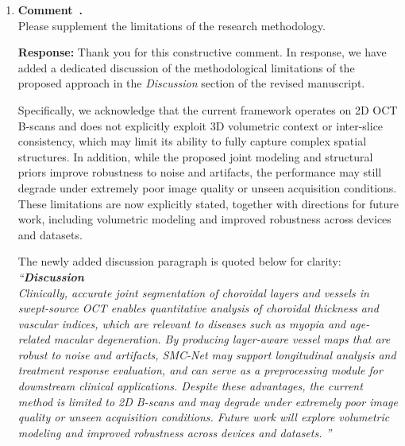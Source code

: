 \documentclass[11pt]{article}
\newcommand{\commentresponse}[2]{{\color{blue}\textbf{Response:} #2}}
\newcommand{\commentitem}{\item \textbf{Comment~\arabic{enumi}.}\\\ignorespaces}
\begin{document}
\begin{enumerate}
    \commentitem Please supplement the limitations of the research methodology.
    
    \commentresponse{6}{
   Thank you for this constructive comment.
    In response, we have added a dedicated discussion of the methodological limitations of the proposed approach in the \emph{Discussion} section of the revised manuscript.
    
    Specifically, we acknowledge that the current framework operates on 2D OCT B-scans and does not explicitly exploit 3D volumetric context or inter-slice consistency, which may limit its ability to fully capture complex spatial structures.
    In addition, while the proposed joint modeling and structural priors improve robustness to noise and artifacts, the performance may still degrade under extremely poor image quality or unseen acquisition conditions.
    These limitations are now explicitly stated, together with directions for future work, including volumetric modeling and improved robustness across devices and datasets.
    
    The newly added discussion paragraph is quoted below for clarity:\\
    \textit{{\color{blue}``\textbf{Discussion}\\
    Clinically, accurate joint segmentation of choroidal layers and vessels in swept-source OCT enables quantitative analysis of choroidal thickness and vascular indices, which are relevant to diseases such as myopia and age-related macular degeneration. By producing layer-aware vessel maps that are robust to noise and artifacts, SMC-Net may support longitudinal analysis and treatment response evaluation, and can serve as a preprocessing module for downstream clinical applications. Despite these advantages, the current method is limited to 2D B-scans and may degrade under extremely poor image quality or unseen acquisition conditions. Future work will explore volumetric modeling and improved robustness across devices and datasets.
    }''}
    }
\end{enumerate}
\end{document}
